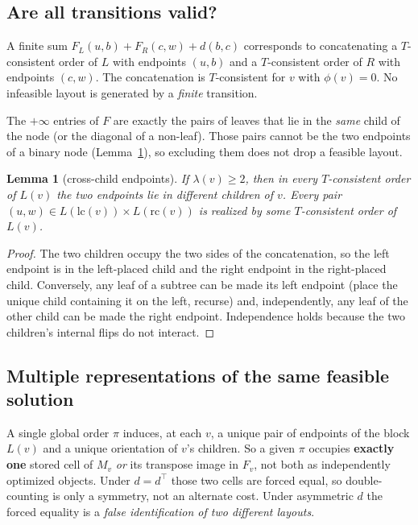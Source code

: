 \documentclass[11pt]{article}
\theoremstyle{plain}
\newtheorem{lemma}[theorem]{Lemma}
\newcommand{\lc}{\mathrm{lc}}
\newcommand{\rc}{\mathrm{rc}}
\begin{document}
\subsection{Are all transitions valid?}

A finite sum \(F_L(u,b)+F_R(c,w)+d(b,c)\) corresponds to concatenating a
\(T\)-consistent order of \(L\) with endpoints \((u,b)\) and a \(T\)-consistent
order of \(R\) with endpoints \((c,w)\). The concatenation is \(T\)-consistent
for \(v\) with \(\phi(v)=0\). No infeasible layout is generated by a
\emph{finite} transition.

The \(+\infty\) entries of \(F\) are exactly the pairs of leaves that lie in
the \emph{same} child of the node (or the diagonal of a non-leaf). Those pairs
cannot be the two endpoints of a binary node (Lemma~\ref{lem:crosschild}), so
excluding them does not drop a feasible layout.

\begin{lemma}[cross-child endpoints]\label{lem:crosschild}
If \(\lambda(v) \ge 2\), then in every \(T\)-consistent order of \(L(v)\) the
two endpoints lie in different children of \(v\). Every pair
\((u,w) \in L(\lc(v)) \times L(\rc(v))\) \emph{is} realized by some
\(T\)-consistent order of \(L(v)\).
\end{lemma}

\begin{proof}
The two children occupy the two sides of the concatenation, so the left
endpoint is in the left-placed child and the right endpoint in the right-placed
child. Conversely, any leaf of a subtree can be made its left endpoint (place
the unique child containing it on the left, recurse) and, independently, any
leaf of the other child can be made the right endpoint. Independence holds
because the two children's internal flips do not interact.
\end{proof}

\subsection{Multiple representations of the same feasible solution}

A single global order \(\pi\) induces, at each \(v\), a unique pair of
endpoints of the block \(L(v)\) and a unique orientation of \(v\)'s children.
So a given \(\pi\) occupies \textbf{exactly one} stored cell of \(M_v\)
\emph{or} its transpose image in \(F_v\), not both as independently optimized
objects. Under \(d = d^\top\) those two cells are forced equal, so
double-counting is only a symmetry, not an alternate cost. Under asymmetric
\(d\) the forced equality is a \emph{false identification of two different
layouts}.
\end{document}
